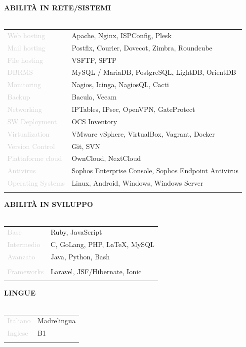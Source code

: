 \documentclass{article}
\begin{document}
\textbf{\textcolor{deepblue}{ABILIT\`A IN RETE/SISTEMI}} \\\\ \hfill
\begin{tabular}{ R{4cm} l }
	\textcolor{lightgray}{Web hosting}       & Apache, Nginx, ISPConfig, Plesk                      \\ \hfill
	\textcolor{lightgray}{Mail hosting}      & Postfix, Courier, Dovecot, Zimbra, Roundcube         \\ \hfill
	\textcolor{lightgray}{File hosting}      & VSFTP, SFTP                                          \\ \hfill
	\textcolor{lightgray}{DBRMS}             & MySQL / MariaDB, PostgreSQL, LightDB, OrientDB       \\ \hfill
	\textcolor{lightgray}{Monitoring}        & Nagios, Icinga, NagiosQL, Cacti                      \\ \hfill
	\textcolor{lightgray}{Backup}            & Bacula, Veeam                                        \\ \hfill
	\textcolor{lightgray}{Networking}        & IPTables, IPsec, OpenVPN, GateProtect                \\ \hfill
	\textcolor{lightgray}{SW Deployment}     & OCS Inventory                                        \\ \hfill
	\textcolor{lightgray}{Virtualization}    & VMware vSphere, VirtualBox, Vagrant, Docker          \\ \hfill
	\textcolor{lightgray}{Version Control}   & Git, SVN                                             \\ \hfill
	\textcolor{lightgray}{Piattaforme cloud} & OwnCloud, NextCloud                                  \\ \hfill
	\textcolor{lightgray}{Antivirus}         & Sophos Enterprise Console, Sophos Endpoint Antivirus \\ \hfill
	\textcolor{lightgray}{Operating Systems} & Linux, Android, Windows, Windows Server              \\ \hfill
\end{tabular}

\textbf{\textcolor{deepblue}{ABILIT\`A IN SVILUPPO}} \\\\ \hfill
\begin{tabular}{ R{4cm} l }
	\textcolor{lightgray}{Base}       & Ruby, JavaScript              \\ \hfill
	\textcolor{lightgray}{Intermedio} & C, GoLang, PHP, LaTeX, MySQL  \\ \hfill
	\textcolor{lightgray}{Avanzato}   & Java, Python, Bash            \\\\ \hfill
	\textcolor{lightgray}{Frameworks} & Laravel, JSF/Hibernate, Ionic \\ \hfill
\end{tabular}

\textbf{\textcolor{deepblue}{LINGUE}} \\\\ \hfill
\begin{tabular}{ R{4cm} l }
	\textcolor{lightgray}{Italiano} & Madrelingua \\ \hfill
	\textcolor{lightgray}{Inglese}  & B1          \\ \hfill
\end{tabular}
\end{document}
